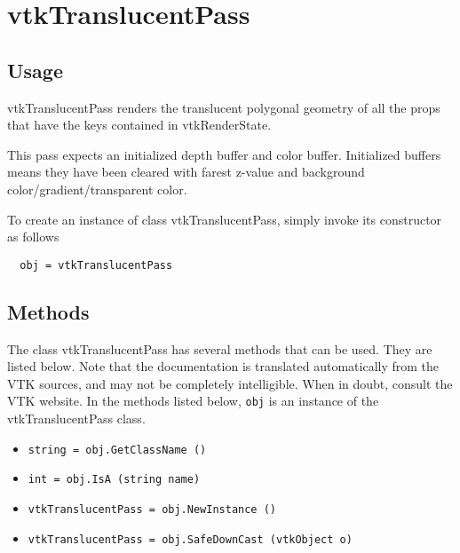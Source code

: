 \section{vtkTranslucentPass}

\subsection{Usage}

 vtkTranslucentPass renders the translucent polygonal geometry of all the
 props that have the keys contained in vtkRenderState.

 This pass expects an initialized depth buffer and color buffer.
 Initialized buffers means they have been cleared with farest z-value and
 background color/gradient/transparent color.
 

To create an instance of class vtkTranslucentPass, simply
invoke its constructor as follows
\begin{verbatim}
  obj = vtkTranslucentPass
\end{verbatim}
\subsection{Methods}

The class vtkTranslucentPass has several methods that can be used.
  They are listed below.
Note that the documentation is translated automatically from the VTK sources,
and may not be completely intelligible.  When in doubt, consult the VTK website.
In the methods listed below, \verb|obj| is an instance of the vtkTranslucentPass class.
\begin{itemize}
\item  \verb|string = obj.GetClassName ()|

\item  \verb|int = obj.IsA (string name)|

\item  \verb|vtkTranslucentPass = obj.NewInstance ()|

\item  \verb|vtkTranslucentPass = obj.SafeDownCast (vtkObject o)|

\end{itemize}
